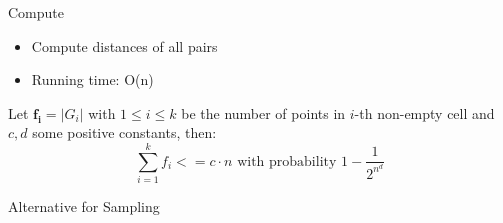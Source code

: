 \documentclass[18pt]{beamer}
\def \loose {15pt}
\begin{document}
\begin{frame}{Compute}
	\begin{itemize}
		\setlength{\itemsep}{\loose}
		\item Compute distances of all pairs
		\item Running time: O(n)
	\end{itemize}
	\begin{theorem}
		Let $\boldsymbol{f_i} = |G_i|$ with $1\leq i \leq k$ be the number of points in $i$-th non-empty cell and $c, d$ some positive constants, then: 
	$$\sum_{i=1}^k f_i <= c \cdot n \text{ with probability } 1 - \frac{1}{2^{n^d}}$$
	\end{theorem}
\end{frame}

\begin{frame}{Alternative for Sampling}

\end{frame}
\end{document}

